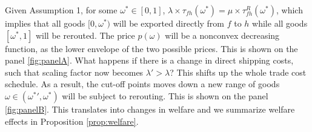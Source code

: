 Given Assumption 1, for some $\omega^* \in [0,1]$, $\lambda \times \tau_{fh}(\omega^*) = \mu \times \tau^R_{fh}(\omega^*)$, which implies that all goods $[0, \omega^*)$ will be exported directly from $f$ to $h$ while all goods $[\omega^*,1]$ will be rerouted. The price $p(\omega)$ will be a nonconvex decreasing function, as the lower envelope of the two possible prices. This is shown on the panel \ref{fig:panelA}. What happens if there is a change in direct shipping costs, such that scaling factor now becomes $\lambda' > \lambda$? This shifts up the whole trade cost schedule. As a result, the cut-off points moves down a new range of goods $\omega \in ({\omega^*}' , \omega^*)$ will be subject to rerouting. This is shown on the panel \ref{fig:panelB}. This translates into changes in welfare and we summarize welfare effects in Proposition \ref{prop:welfare}.

\newpage

